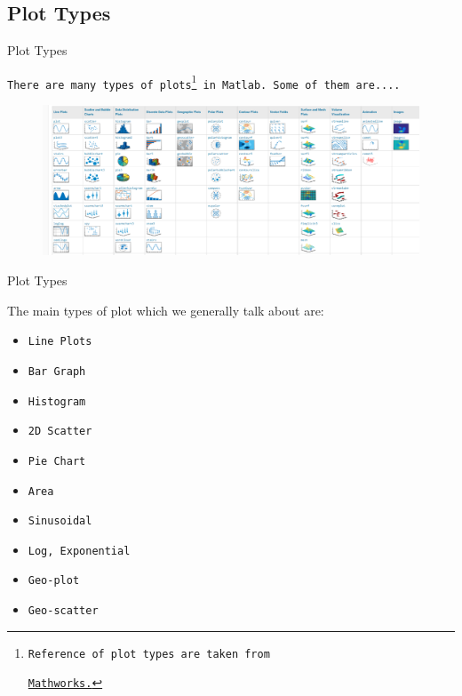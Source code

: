 \documentclass[10pt,xcolor={dvipsnames}]{beamer}
\newcommand{\chref}[2]{
  \href{#1}{{\usebeamercolor[bg]{Feather}#2}}
}
\begin{document}
\subsection{Plot Types}
\begin{frame}{Plot Types}

\texttt{There are many types of plots\footnote{Reference of plot types are taken from 
\chref{https://in.mathworks.com/help/matlab/creating_plots/types-of-matlab-plots.html}{Mathworks.}} in Matlab. Some of them are....}\\

\begin{figure}[t]
   
    \includegraphics[height=\dimexpr5\textheight/10\relax]{./Images/plot-types.png}
    
\end{figure}

\end{frame}

\begin{frame}{Plot Types}

\begin{block}{}
The main types of plot which we generally talk about are:
  \begin{itemize}
    \item {\tt Line Plots}
    \item {\tt Bar Graph}
    \item {\tt Histogram}
    \item {\tt 2D Scatter}
    \item {\tt Pie Chart}
    \item {\tt Area}
    \item {\tt Sinusoidal}
    \item {\tt Log, Exponential}
    \item {\tt Geo-plot}
    \item {\tt Geo-scatter}
    
  \end{itemize}
\end{block}
\end{frame}
\end{document}
